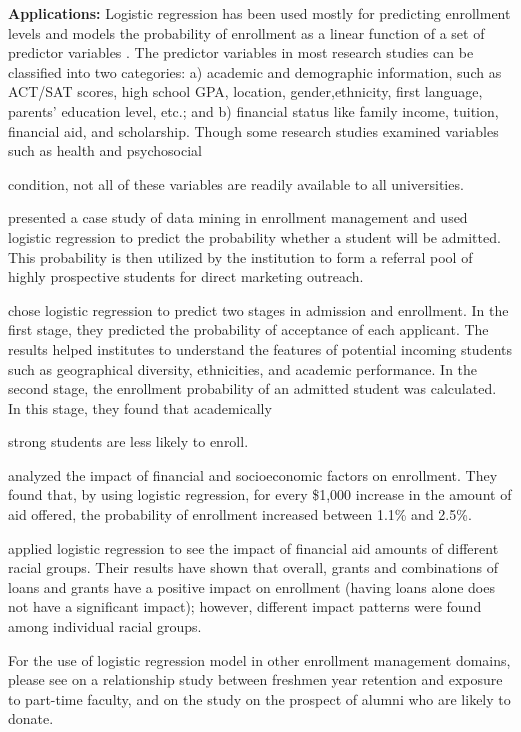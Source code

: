 \documentclass[12pt,english]{report}
\begin{document}
\vspace{0.25in}
\noindent \textbf{Applications:} Logistic regression has been used mostly for
predicting enrollment levels and models the probability of enrollment as a
linear
function of a set of predictor variables \citep{lr_summary}. The predictor 
variables in most research studies can be classified into two categories: a) 
academic and demographic information, such as ACT/SAT scores, high school GPA, 
location, gender,ethnicity, first language, parents' education level, etc.; and
b) 
financial status like family income, tuition, financial aid, and scholarship.
Though some research studies examined variables such as health and psychosocial

condition, not all of these variables are readily available to all
universities.

\citet{lr_1_chang} presented a case study of data mining in enrollment
management and
used logistic regression to predict the probability whether a student will be
admitted.
This probability is then utilized by the institution to form a referral pool of
highly
prospective students for direct marketing outreach.

\citet{lr_2} chose logistic regression to predict two stages in admission and
enrollment. In the first stage, they predicted the probability of acceptance of
each applicant. The results helped institutes to understand the features of
potential  incoming students such as geographical diversity, ethnicities, and
academic  performance. In the second stage, the enrollment probability of an
admitted student was calculated. In this stage, they found that academically

strong students are less likely to enroll.

\citet{Braunstein1999} analyzed the impact of financial and socioeconomic 
factors on enrollment. They found that, by using logistic regression, 
for every \$1,000 increase  in the amount of aid offered, the probability of 
enrollment increased between 1.1\% and  2.5\%.

\citet{lr_aid2} applied logistic regression to see the impact of financial aid 
amounts of different racial groups. Their results have shown that overall, 
grants and combinations of loans and grants have a positive impact on
enrollment 
(having loans alone does not have a significant impact); however, 
different impact patterns were found among individual racial groups.

For the use of logistic regression model in other enrollment management
domains, 
please see \citet{lr_retention2} on a relationship study between freshmen year 
retention and exposure to part-time faculty, and \citep{lr_alumni1,lr_alumni2}
on 
the study on the prospect of alumni who are likely to donate.
\end{document}
